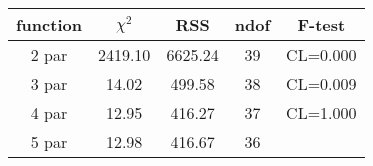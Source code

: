 \begin{tabular}{c|c|c|c|c}
function & $\chi^2$ & RSS & ndof & F-test \\
\hline
2 par & 2419.10 & 6625.24 & 39 & CL=0.000 \\
3 par & 14.02 & 499.58 & 38 & CL=0.009 \\
4 par & 12.95 & 416.27 & 37 & CL=1.000 \\
5 par & 12.98 & 416.67 & 36 & \\
\hline
\end{tabular}